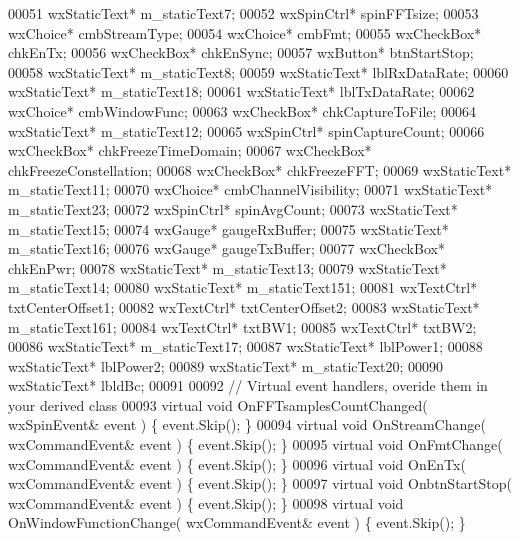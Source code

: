 \begin{DoxyCode}
00051         wxStaticText* m_staticText7;
00052         wxSpinCtrl* spinFFTsize;
00053         wxChoice* cmbStreamType;
00054         wxChoice* cmbFmt;
00055         wxCheckBox* chkEnTx;
00056         wxCheckBox* chkEnSync;
00057         wxButton* btnStartStop;
00058         wxStaticText* m_staticText8;
00059         wxStaticText* lblRxDataRate;
00060         wxStaticText* m_staticText18;
00061         wxStaticText* lblTxDataRate;
00062         wxChoice* cmbWindowFunc;
00063         wxCheckBox* chkCaptureToFile;
00064         wxStaticText* m_staticText12;
00065         wxSpinCtrl* spinCaptureCount;
00066         wxCheckBox* chkFreezeTimeDomain;
00067         wxCheckBox* chkFreezeConstellation;
00068         wxCheckBox* chkFreezeFFT;
00069         wxStaticText* m_staticText11;
00070         wxChoice* cmbChannelVisibility;
00071         wxStaticText* m_staticText23;
00072         wxSpinCtrl* spinAvgCount;
00073         wxStaticText* m_staticText15;
00074         wxGauge* gaugeRxBuffer;
00075         wxStaticText* m_staticText16;
00076         wxGauge* gaugeTxBuffer;
00077         wxCheckBox* chkEnPwr;
00078         wxStaticText* m_staticText13;
00079         wxStaticText* m_staticText14;
00080         wxStaticText* m_staticText151;
00081         wxTextCtrl* txtCenterOffset1;
00082         wxTextCtrl* txtCenterOffset2;
00083         wxStaticText* m_staticText161;
00084         wxTextCtrl* txtBW1;
00085         wxTextCtrl* txtBW2;
00086         wxStaticText* m_staticText17;
00087         wxStaticText* lblPower1;
00088         wxStaticText* lblPower2;
00089         wxStaticText* m_staticText20;
00090         wxStaticText* lbldBc;
00091         
00092         \textcolor{comment}{// Virtual event handlers, overide them in your derived class}
00093         \textcolor{keyword}{virtual} \textcolor{keywordtype}{void} OnFFTsamplesCountChanged( wxSpinEvent& event ) \{ \textcolor{keyword}{event}.Skip(); \}
00094         \textcolor{keyword}{virtual} \textcolor{keywordtype}{void} OnStreamChange( wxCommandEvent& event ) \{ \textcolor{keyword}{event}.Skip(); \}
00095         \textcolor{keyword}{virtual} \textcolor{keywordtype}{void} OnFmtChange( wxCommandEvent& event ) \{ \textcolor{keyword}{event}.Skip(); \}
00096         \textcolor{keyword}{virtual} \textcolor{keywordtype}{void} OnEnTx( wxCommandEvent& event ) \{ \textcolor{keyword}{event}.Skip(); \}
00097         \textcolor{keyword}{virtual} \textcolor{keywordtype}{void} OnbtnStartStop( wxCommandEvent& event ) \{ \textcolor{keyword}{event}.Skip(); \}
00098         \textcolor{keyword}{virtual} \textcolor{keywordtype}{void} OnWindowFunctionChange( wxCommandEvent& event ) \{ \textcolor{keyword}{event}.Skip(); \}

\end{DoxyCode}
